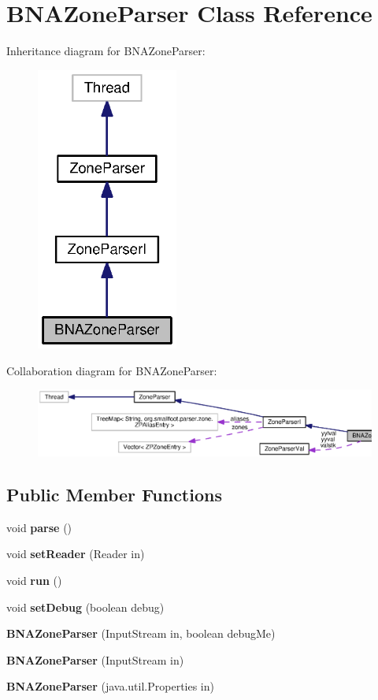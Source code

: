 \section{B\+N\+A\+Zone\+Parser Class Reference}
\label{classorg_1_1smallfoot_1_1parser_1_1zone_1_1BNAZoneParser}


Inheritance diagram for B\+N\+A\+Zone\+Parser\+:\nopagebreak
\begin{figure}[H]
\begin{center}
\leavevmode
\includegraphics[width=132pt]{classorg_1_1smallfoot_1_1parser_1_1zone_1_1BNAZoneParser__inherit__graph}
\end{center}
\end{figure}


Collaboration diagram for B\+N\+A\+Zone\+Parser\+:\nopagebreak
\begin{figure}[H]
\begin{center}
\leavevmode
\includegraphics[width=350pt]{classorg_1_1smallfoot_1_1parser_1_1zone_1_1BNAZoneParser__coll__graph}
\end{center}
\end{figure}
\subsection*{Public Member Functions}
\begin{DoxyCompactItemize}
\item 
void {\bf parse} ()
\item 
void {\bf set\+Reader} (Reader in)
\item 
void {\bf run} ()
\item 
void {\bf set\+Debug} (boolean debug)
\item 
{\bf B\+N\+A\+Zone\+Parser} (Input\+Stream in, boolean debug\+Me)
\item 
{\bf B\+N\+A\+Zone\+Parser} (Input\+Stream in)
\item 
{\bf B\+N\+A\+Zone\+Parser} (java.\+util.\+Properties in)
\end{DoxyCompactItemize}
